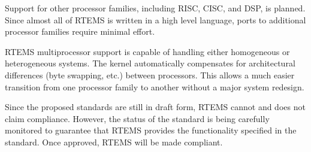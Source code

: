 Support for other processor families, including R\+I\+SC, C\+I\+SC, and D\+SP, is planned. Since almost all of R\+T\+E\+MS is written in a high level language, ports to additional processor families require minimal effort.

R\+T\+E\+MS multiprocessor support is capable of handling either homogeneous or heterogeneous systems. The kernel automatically compensates for architectural differences (byte swapping, etc.) between processors. This allows a much easier transition from one processor family to another without a major system redesign.

Since the proposed standards are still in draft form, R\+T\+E\+MS cannot and does not claim compliance. However, the status of the standard is being carefully monitored to guarantee that R\+T\+E\+MS provides the functionality specified in the standard. Once approved, R\+T\+E\+MS will be made compliant. 
